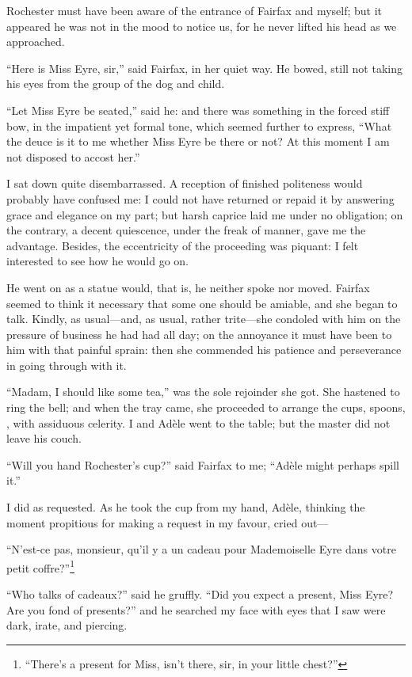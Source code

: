 \Mr{} Rochester must have been aware of the entrance of \Mrs{} Fairfax and
myself; but it appeared he was not in the mood to notice us, for he
never lifted his head as we approached.

\enquote{Here is Miss Eyre, sir,} said \Mrs{} Fairfax, in her quiet way. 
He bowed, still not taking his eyes from the group of the dog and child.

\enquote{Let Miss Eyre be seated,} said he: and there was something in
the forced stiff bow, in the impatient yet formal tone, which seemed
further to express, \enquote{What the deuce is it to me whether Miss
Eyre be there or not? At this moment I am not disposed to accost her.}

I sat down quite disembarrassed. A reception of finished politeness
would probably have confused me: I could not have returned or repaid it
by answering grace and elegance on my part; but harsh caprice laid me
under no obligation; on the contrary, a decent quiescence, under the
freak of manner, gave me the advantage. Besides, the eccentricity of
the proceeding was piquant: I felt interested to see how he would go on.

He went on as a statue would, that is, he neither spoke nor moved. \Mrs{}
Fairfax seemed to think it necessary that some one should be amiable,
and she began to talk. Kindly, as usual---and, as usual, rather
trite---she condoled with him on the pressure of business he had had all
day; on the annoyance it must have been to him with that painful sprain:
then she commended his patience and perseverance in going through with
it.

\enquote{Madam, I should like some tea,} was the sole rejoinder she
got. She hastened to ring the bell; and when the tray came, she
proceeded to arrange the cups, spoons, \etc, with assiduous celerity. I
and Adèle went to the table; but the master did not leave his couch.

\enquote{Will you hand \Mr{} Rochester's cup?} said \Mrs{} Fairfax to me;
\enquote{Adèle might perhaps spill it.}

I did as requested. As he took the cup from my hand, Adèle, thinking
the moment propitious for making a request in my favour, cried out---

\foreignquote{french}{N'est-ce pas, monsieur, qu'il y a un cadeau pour Mademoiselle
Eyre dans votre petit coffre?}\footnote{\enquote{There's a present for Miss, isn't there, sir, in your little chest?}}

\enquote{Who talks of \foreignlanguage{french}{cadeaux}?} said he gruffly. \enquote{Did you
expect a present, Miss Eyre? Are you fond of presents?} and he searched
my face with eyes that I saw were dark, irate, and piercing.

